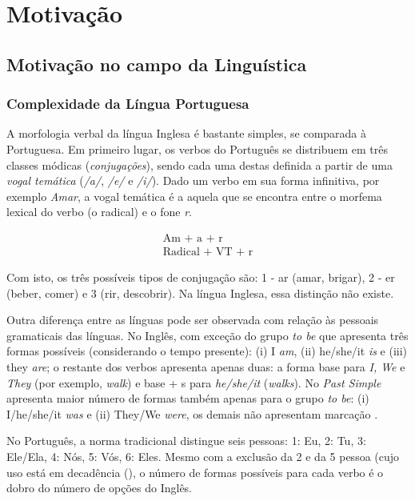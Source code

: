 \section{Motivação}
\label{sec:motivation}

\subsection{Motivação no campo da Linguística}

\subsubsection{Complexidade da Língua Portuguesa}

A morfologia verbal da língua Inglesa é bastante simples, se comparada à Portuguesa. Em primeiro lugar, os verbos do Português se distribuem em três classes módicas (\textit{conjugações}), sendo cada uma destas definida a partir de uma \textit{vogal temática} (\textit{/a/}, \textit{/e/} e \textit{/i/}). Dado um verbo em sua forma infinitiva, por exemplo \textit{Amar}, a vogal temática é a aquela que se encontra entre o morfema lexical do verbo (o radical) e o fone \textit{r}.

\begin{align*}
    \text{Am + a + r}\\
    \text{Radical + VT + r} 
\end{align*}

Com isto, os três possíveis tipos de conjugação são: 1 - ar (amar, brigar), 2 - er (beber, comer) e 3 (rir, descobrir). Na língua Inglesa, essa distinção não existe. 

Outra diferença entre as línguas pode ser observada com relação às pessoais gramaticais das línguas. No Inglês, com exceção do grupo \textit{to be} que apresenta três formas possíveis (considerando o tempo presente): (i) I \textit{am}, (ii) he/she/it \textit{is} e (iii) they \textit{are}; o restante dos verbos apresenta apenas duas: a forma base para \textit{I, We} e \textit{They} (por exemplo, \textit{walk}) e base + s para \textit{he/she/it }(\textit{walks}). No \textit{Past Simple} apresenta maior número de formas também apenas para o grupo \textit{to be}: (i) I/he/she/it \textit{was} e (ii) They/We \textit{were}, os demais não apresentam marcação \cite{Nelson:2010}. 

No Português, a norma tradicional distingue seis pessoas: 1: Eu, 2: Tu, 3: Ele/Ela, 4: Nós, 5: Vós, 6: Eles. Mesmo com a exclusão da 2 e da 5 pessoa (cujo uso está em decadência (\cite{1999:camara}), o número de formas possíveis para cada verbo é o dobro do número de opções do Inglês.


